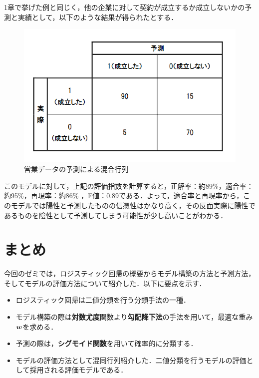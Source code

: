 \documentclass[a4j, 11pt]{jsarticle}
\numberwithin{equation}{section}
\newcommand{\mathbm}[1]{{\mbox{\boldmath $#1$}}}
\begin{document}
\vspace{10mm}
\indent 1章で挙げた例と同じく，他の企業に対して契約が成立するか成立しないかの予測と実績として，以下のような結果が得られたとする．\\
\begin{figure}[H]
    \centering
    \mbox{{\includegraphics[scale=0.7]{fig7_CM_ex.png}}}
    \caption{営業データの予測による混合行列}
    \label{CM_ex}
\end{figure}

\indent このモデルに対して，上記の評価指数を計算すると，正解率：約89\%，適合率：約95\%，再現率：約86\%		，F値：0.89である．よって，適合率と再現率から，このモデルでは陽性と予測したものの信憑性はかなり高く，その反面実際に陽性であるものを陰性として予測してしまう可能性が少し高いことがわかる．\\

\section{まとめ}
\indent 今回のゼミでは，ロジスティック回帰の概要からモデル構築の方法と予測方法，そしてモデルの評価方法について紹介した．以下に要点を示す．\\
\begin{itemize}
\item ロジスティック回帰は二値分類を行う分類手法の一種．
\item モデル構築の際は\textbf{対数尤度}関数より\textbf{勾配降下法}の手法を用いて，最適な重み$\mathbm{w}$を求める．
\item 予測の際は，\textbf{シグモイド関数}を用いて確率的に分類する．
\item モデルの評価方法として{混同行列}紹介した．二値分類を行うモデルの評価として採用される評価モデルである．
\end{itemize}
\end{document}
